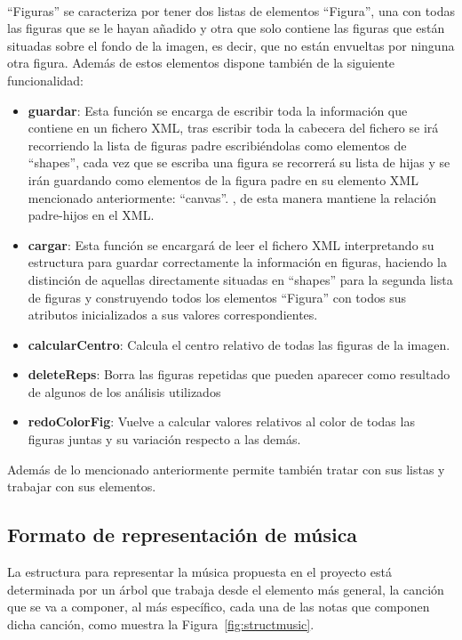 \\``Figuras'' se caracteriza por tener dos listas de elementos ``Figura'', una con todas las figuras que se le hayan añadido y otra que solo contiene las figuras que están situadas sobre el fondo de la imagen, es decir, que no están envueltas por ninguna otra figura. Además de estos elementos dispone también de la siguiente funcionalidad:
\begin{itemize}
\item \textbf{guardar}: Esta función se encarga de escribir toda la información que contiene en un fichero XML, tras escribir toda la cabecera del fichero se irá recorriendo la lista de figuras padre escribiéndolas como elementos de ``shapes'', cada vez que se escriba una figura se recorrerá su lista de hijas y se irán guardando como elementos de la figura padre en su elemento XML mencionado anteriormente: ``canvas''. , de esta manera mantiene la relación padre-hijos en el XML.
\item \textbf{cargar}: Esta función se encargará de leer el fichero XML interpretando su estructura para guardar correctamente la información en figuras, haciendo la distinción de aquellas directamente situadas en ``shapes'' para la segunda lista de figuras y construyendo todos los elementos ``Figura'' con todos sus atributos inicializados a sus valores correspondientes.
\item \textbf{calcularCentro}: Calcula el centro relativo de todas las figuras de la imagen.
\item \textbf{deleteReps}: Borra las figuras repetidas que pueden aparecer como resultado de algunos de los análisis utilizados 
\item \textbf{redoColorFig}: Vuelve a calcular valores relativos al color de todas las figuras juntas y su variación respecto a las demás.  
\end{itemize}
Además de lo mencionado anteriormente permite también tratar con sus listas y trabajar con sus elementos.

\subsection{Formato de representación de música}


La estructura para representar la música propuesta en el proyecto está determinada por un árbol que trabaja desde el elemento más general, la canción que se va a componer, al más específico, cada una de las notas que componen dicha canción, como muestra la Figura~\ref{fig:structmusic}.\\
	
